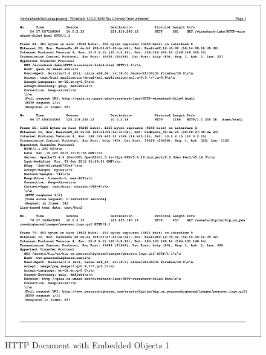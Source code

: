 \documentclass[titlepage, paper=a4, fontsize=11pt]{scrartcl} %
\numberwithin{equation}{section} %
\numberwithin{figure}{section} %
\numberwithin{table}{section} %
\begin{document}
\begin{figure}[!ht]
    \includegraphics[width=\textwidth]{images/refobj1.pdf}
    \caption{HTTP Document with Embedded Objects 1}
    \label{fig:refobj1}
\end{figure}
\end{document}
